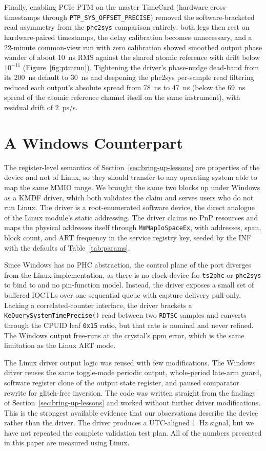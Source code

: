 \documentclass[conference,a4paper]{IEEEtran}
\newcommand{\reffig}[1]{Figure~\ref{#1}\xspace}
\newcommand{\reftab}[1]{Table~\ref{#1}\xspace}
\newcommand{\refsec}[1]{Section~\ref{#1}\xspace}
\newcommand{\phcsys}{\texttt{phc2sys}\xspace}
\newcommand{\tsphc}{\texttt{ts2phc}\xspace}
\begin{document}
Finally, enabling PCIe PTM on the master TimeCard (hardware cross-timestamps through \texttt{PTP\_SYS\_OFFSET\_PRECISE}) removed the software-bracketed read asymmetry from the \phcsys comparison entirely: both legs then rest on hardware-paired timestamps, the delay calibration becomes unnecessary, and a 22-minute common-view run with zero calibration showed smoothed output phase wander of about 10~ns RMS against the shared atomic reference with drift below $10^{-11}$ (\reffig{fig:ptmrun}). Tightening the driver's phase-nudge dead-band from its 200~ns default to 30~ns and deepening the phc2sys per-sample read filtering reduced each output's absolute spread from 78~ns to 47~ns (below the 69~ns spread of the atomic reference channel itself on the same instrument), with residual drift of $2$~ps/s.

\section{A Windows Counterpart}\label{sec:windows}

The register-level semantics of \refsec{sec:bring-up-lessons} are properties of the device and not of Linux, so they should transfer to any operating system able to map the same MMIO range. We brought the same two blocks up under Windows as a KMDF driver, which both validates the claim and serves users who do not run Linux. The driver is a root-enumerated software device, the direct analogue of the Linux module's static addressing. The driver claims no PnP resources and maps the physical addresses itself through \texttt{MmMapIoSpaceEx}, with addresses, span, block count, and ART frequency in the service registry key, seeded by the INF with the defaults of \reftab{tab:params}.

Since Windows has no PHC abstraction, the control plane of the port diverges from the Linux implementation, as there is no clock device for \tsphc or \phcsys to bind to and no pin-function model. Instead, the driver exposes a small set of buffered IOCTLs over one sequential queue with capture delivery pull-only. Lacking a correlated-counter interface, the driver brackets a \texttt{KeQuerySystemTimePrecise()} read between two \texttt{RDTSC} samples and converts through the CPUID leaf \texttt{0x15} ratio, but that rate is nominal and never refined. The Windows output free-runs at the crystal's ppm error, which is the same limitation as the Linux ART mode.

The Linux driver output logic was reused with few modifications. The Windows driver reuses the same toggle-mode periodic output, whole-period late-arm guard, software register clone of the output state register, and paused comparator rewrite for glitch-free inversion. The code was written straight from the findings of \refsec{sec:bring-up-lessons} and worked without further driver modifications. This is the strongest available evidence that our observations describe the device rather than the driver. The driver produces a UTC-aligned 1~Hz signal, but we have not repeated the complete validation test plan. All of the numbers presented in this paper are measured using Linux.
\end{document}
